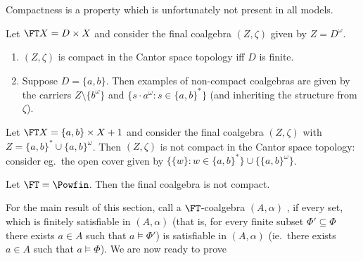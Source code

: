 \documentclass{entcs}
\begin{document}
Compactness is a property which is unfortunately not present in all models.



\begin{example}\label{exle:non-cmp:streams}
  Let $\FT X = D \times X$ and consider the final coalgebra $(Z,
  \zeta)$ given by $Z=D^\omega$.
\begin{enumerate}
\item $(Z, \zeta)$ is compact in the Cantor space
  topology iff $D$ is finite.
\item Suppose $D=\{a,b\}$. Then examples of non-compact coalgebras are given by
  the carriers $Z\setminus\{b^\omega\}$ and $\{s\cdot a^\omega:
s\in\{a,b\}^*\}$ (and inheriting the structure from $\zeta$).
\end{enumerate}
\end{example}

\begin{example}
  Let $\FT X = \{a,b\} \times X + 1$ and consider the final coalgebra $(Z,
  \zeta)$ with $Z=\{a,b\}^*\cup\{a,b\}^\omega$. Then $(Z, \zeta)$ is not
  compact in the Cantor space topology: consider eg.\  the open cover given by
  $\{\{w\}: w\in\{a,b\}^*\}\cup\{\{a,b\}^\omega\}$.
\end{example}

\begin{example}\label{exle:non-cmp:finite-powerset}
Let $\FT=\Powfin$. Then the final coalgebra is not compact.
\end{example}




For the main result of this section, call a $\FT$-coalgebra
$(A,\alpha)$ , if every set, which is
finitely satisfiable in $(A,\alpha)$ (that is, for every finite subset
$\Phi' \subseteq \Phi$ there exists $a \in A$ such that $a \models
\Phi'$) is satisfiable in $(A,\alpha)$ (ie.\ there exists $a \in A$
such that $a \models \Phi$). We are now ready to prove
\end{document}
